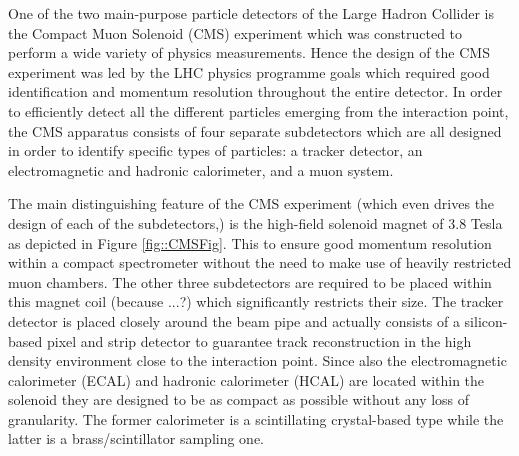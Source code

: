 One of the two main-purpose particle detectors of the Large Hadron Collider is the Compact Muon Solenoid (CMS) experiment which was constructed to perform a wide variety of physics measurements. Hence the design of the CMS experiment was led by the LHC physics programme goals which required good identification and momentum resolution throughout the entire detector.
In order to efficiently detect all the different particles emerging from the interaction point, the CMS apparatus consists of four separate subdetectors which are all designed in order to identify specific types of particles: a tracker detector, an electromagnetic and hadronic calorimeter, and a muon system.

The main distinguishing feature of the CMS experiment (which even drives the design of each of the subdetectors,) is the high-field solenoid magnet of $3.8$ Tesla as depicted in Figure \ref{fig::CMSFig}. This to ensure good momentum resolution within a compact spectrometer without the need to make use of heavily restricted muon chambers. The other three subdetectors are required to be placed within this magnet coil (because ...?) which significantly restricts their size. The tracker detector is placed closely around the beam pipe and actually consists of a silicon-based pixel and strip detector to guarantee track reconstruction in the high density environment close to the interaction point. Since also the electromagnetic calorimeter (ECAL) and hadronic calorimeter (HCAL) are located within the solenoid they are designed to be as compact as possible without any loss of granularity. The former calorimeter is a scintillating crystal-based type while the latter is a brass/scintillator sampling one.
